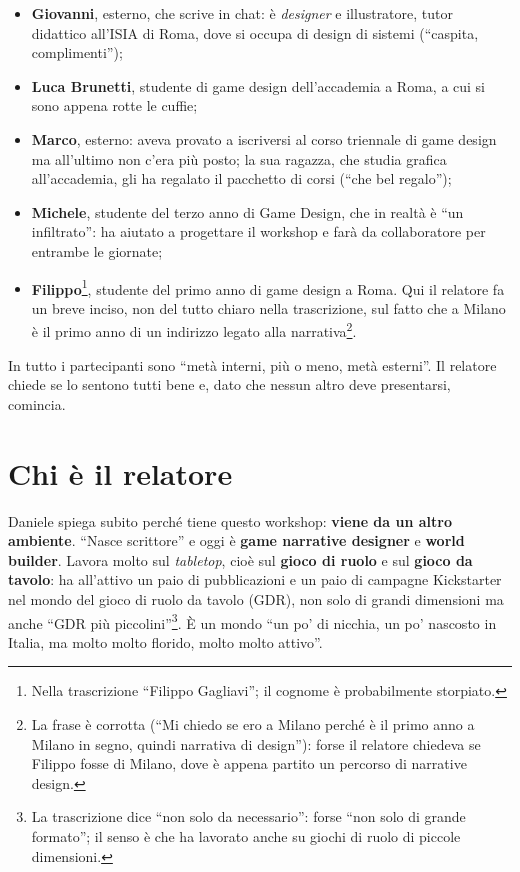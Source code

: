 \begin{itemize}
        musica ma è molto interessato alla scrittura e alla narrazione nei
        videogiochi. Il relatore spiega che il workshop è ``molto tarato
        sull'arte e sulla scrittura'', ma ``con i dovuti accomodamenti'' si può
        seguire anche venendo da un altro ambito: è mirato a chi non fa game
        design;
  \item \textbf{Giovanni}, esterno, che scrive in chat: è \emph{designer} e
        illustratore, tutor didattico all'ISIA di Roma, dove si occupa di design
        di sistemi (``caspita, complimenti'');
  \item \textbf{Luca Brunetti}, studente di game design dell'accademia a Roma,
        a cui si sono appena rotte le cuffie;
  \item \textbf{Marco}, esterno: aveva provato a iscriversi al corso triennale
        di game design ma all'ultimo non c'era più posto; la sua ragazza, che
        studia grafica all'accademia, gli ha regalato il pacchetto di corsi
        (``che bel regalo'');
  \item \textbf{Michele}, studente del terzo anno di Game Design, che in realtà
        è ``un infiltrato'': ha aiutato a progettare il workshop e farà da
        collaboratore per entrambe le giornate;
  \item \textbf{Filippo}\footnote{Nella trascrizione ``Filippo Gagliavi''; il
        cognome è probabilmente storpiato.}, studente del primo anno di game
        design a Roma. Qui il relatore fa un breve inciso, non del tutto chiaro
        nella trascrizione, sul fatto che a Milano è il primo anno di un
        indirizzo legato alla narrativa\footnote{La frase è corrotta (``Mi chiedo
        se ero a Milano perché è il primo anno a Milano in segno, quindi
        narrativa di design''): forse il relatore chiedeva se Filippo fosse di
        Milano, dove è appena partito un percorso di narrative design.}.
\end{itemize}
In tutto i partecipanti sono ``metà interni, più o meno, metà esterni''. Il
relatore chiede se lo sentono tutti bene e, dato che nessun altro deve
presentarsi, comincia.

\section{Chi è il relatore}
\label{sec:z6-relatore}

Daniele spiega subito perché tiene questo workshop: \textbf{viene da un altro
ambiente}. ``Nasce scrittore'' e oggi è \textbf{game narrative designer} e
\textbf{world builder}. Lavora molto sul \emph{tabletop}, cioè sul
\textbf{gioco di ruolo} e sul \textbf{gioco da tavolo}: ha all'attivo un paio di
pubblicazioni e un paio di campagne Kickstarter nel mondo del gioco di ruolo da
tavolo (GDR), non solo di grandi dimensioni ma anche ``GDR più
piccolini''\footnote{La trascrizione dice ``non solo da necessario'': forse
``non solo di grande formato''; il senso è che ha lavorato anche su giochi di
ruolo di piccole dimensioni.}. È un mondo ``un po' di nicchia, un po' nascosto
in Italia, ma molto molto florido, molto molto attivo''.

